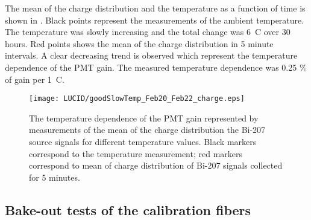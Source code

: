 The mean of the charge distribution and the temperature as a function of time is shown in .
Black points represent the measurements of the ambient temperature. The temperature was slowly increasing and the total change was 6\degree~C over 30 hours.
Red points shows the mean of the charge distribution in 5 minute intervals.
A clear decreasing trend is observed which represent the temperature dependence of the PMT gain.
The measured temperature dependence was 0.25 $\%$ of gain per 1\degree~C. 

\begin{figure}
\centering
\texttt{[image: LUCID/goodSlowTemp\_Feb20\_Feb22\_charge.eps]}
\caption{The temperature dependence of the PMT gain represented by measurements of the mean of the charge distribution the Bi-207 source signals 
for different temperature values.
Black markers correspond to the temperature measurement; red markers correspond to mean of charge distribution of Bi-207 signals collected for 5 minutes.}
\label{fig:PMTChargeTempDep}
\end{figure}

\subsection{Bake-out tests of the calibration fibers}
% 
% 
% 

